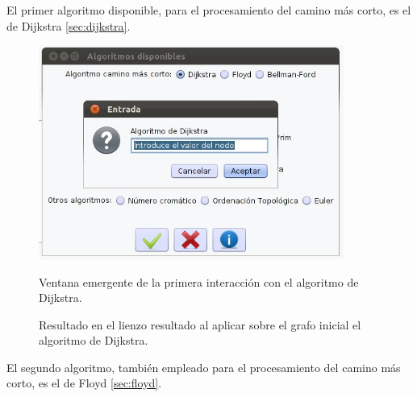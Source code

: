 El primer algoritmo disponible, para el procesamiento del camino más corto, es el de Dijkstra \ref{sec:dijkstra}.
\newpage
\begin{figure}[H]
\begin{center}
\includegraphics[width=10cm]{./imagenes_documentacion/imagen_icono_dijkstra_ventana_datos.jpeg}
\caption{Ventana emergente de la primera interacción con el algoritmo de Dijkstra.}
\caption{Resultado en el lienzo resultado al aplicar sobre el grafo inicial el algoritmo de Dijkstra.}
\end{center}
\end{figure}

\newpage
El segundo algoritmo, también empleado para el procesamiento del camino más corto, es el de Floyd \ref{sec:floyd}.

